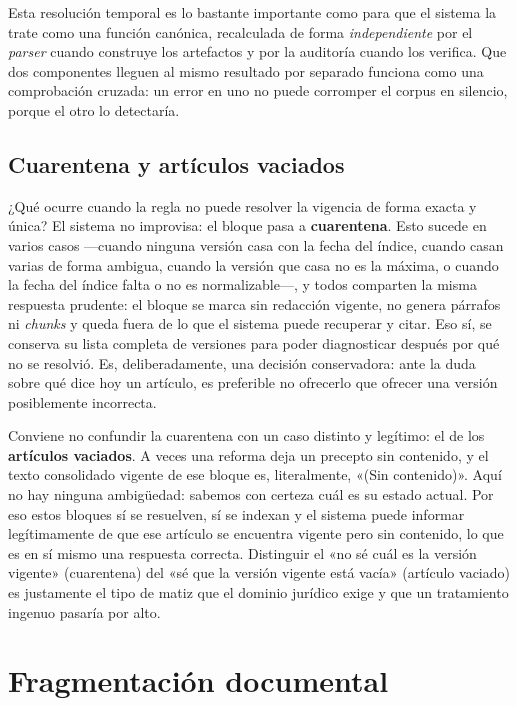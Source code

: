 Esta resolución temporal es lo bastante importante como para que el sistema la trate como una función canónica, recalculada de forma \emph{independiente} por el \emph{parser} cuando construye los artefactos y por la auditoría cuando los verifica. Que dos componentes lleguen al mismo resultado por separado funciona como una comprobación cruzada: un error en uno no puede corromper el corpus en silencio, porque el otro lo detectaría.

\subsection{Cuarentena y artículos vaciados}
\label{subsec:cuarentena}

¿Qué ocurre cuando la regla no puede resolver la vigencia de forma exacta y única? El sistema no improvisa: el bloque pasa a \textbf{cuarentena}. Esto sucede en varios casos —cuando ninguna versión casa con la fecha del índice, cuando casan varias de forma ambigua, cuando la versión que casa no es la máxima, o cuando la fecha del índice falta o no es normalizable—, y todos comparten la misma respuesta prudente: el bloque se marca sin redacción vigente, no genera párrafos ni \emph{chunks} y queda fuera de lo que el sistema puede recuperar y citar. Eso sí, se conserva su lista completa de versiones para poder diagnosticar después por qué no se resolvió. Es, deliberadamente, una decisión conservadora: ante la duda sobre qué dice hoy un artículo, es preferible no ofrecerlo que ofrecer una versión posiblemente incorrecta.

Conviene no confundir la cuarentena con un caso distinto y legítimo: el de los \textbf{artículos vaciados}. A veces una reforma deja un precepto sin contenido, y el texto consolidado vigente de ese bloque es, literalmente, «(Sin contenido)». Aquí no hay ninguna ambigüedad: sabemos con certeza cuál es su estado actual. Por eso estos bloques sí se resuelven, sí se indexan y el sistema puede informar legítimamente de que ese artículo se encuentra vigente pero sin contenido, lo que es en sí mismo una respuesta correcta. Distinguir el «no sé cuál es la versión vigente» (cuarentena) del «sé que la versión vigente está vacía» (artículo vaciado) es justamente el tipo de matiz que el dominio jurídico exige y que un tratamiento ingenuo pasaría por alto.

\section{Fragmentación documental}
\label{sec:fragmentacion}


